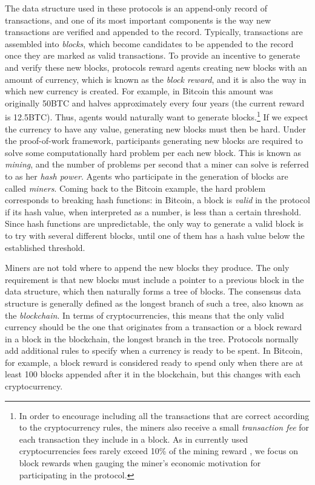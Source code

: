 The data structure used in these protocols is an append-only record of transactions, and one of its most important components is the way new transactions 
are  verified and appended to the record. Typically, transactions are assembled into \emph{blocks}, which become candidates to be appended to the record once they are 
marked as valid transactions. 
To provide an incentive to generate and verify these new blocks, protocols reward agents creating new blocks with an amount of currency, which is known as the \emph{block reward}, and it is also the way in which new currency is created. For example, in Bitcoin this amount was originally 50BTC and halves approximately every four years (the current reward is 12.5BTC). 
Thus, agents would naturally want to generate blocks.\footnote{In order to encourage including all the transactions that are correct according to the cryptocurrency rules, the miners also receive a small {\em transaction fee} for each transaction they include in a block. As in currently used cryptocurrencies fees rarely exceed 10\% of the mining reward \cite{TotalMiningRevenue,TotalMiningFees}, we focus on block rewards when gauging the miner's economic motivation for participating in the protocol.} If we expect the currency to have any value, generating new blocks must then be hard. Under the proof-of-work framework, participants generating new blocks are required to solve some computationally hard problem per each new block.  This is known as \emph{mining}, and the number of problems per second that a miner can solve is referred to as her \emph{hash power}. Agents who participate in the generation of blocks are called \emph{miners}. Coming back to the Bitcoin example, the hard problem corresponds to breaking hash functions: 
in Bitcoin, a block is \emph{valid} in the protocol if its hash value, when interpreted as a number, is less than a certain threshold. Since hash functions are unpredictable, the only way to generate a valid block is to try with several different blocks, until one of them has a hash value below the established threshold. 



Miners are not told where to append the new blocks they produce. The only requirement is that new blocks must include a pointer to a previous block in the data structure, 
which then naturally forms a tree of blocks. The consensus data structure is generally defined as the longest branch of such a tree, also known as the \emph{blockchain}. 
In terms of cryptocurrencies, this means that the only valid currency should be the one that originates from a transaction or a block reward in a block in the blockchain, the longest branch in the tree. Protocols normally add additional rules to specify when a currency is ready to be spent. In Bitcoin, for example, a block reward is considered ready to spend only when there are 
at least 100 blocks appended after it in the blockchain, but this changes with each cryptocurrency.

